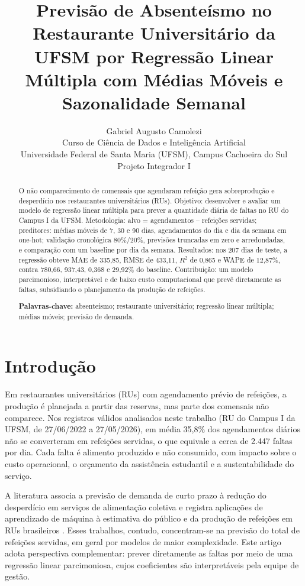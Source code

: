 \documentclass[11pt]{article}
\title{\large Previsão de Absenteísmo no
Restaurante Universitário da UFSM
por Regressão Linear Múltipla
com Médias Móveis e Sazonalidade Semanal}
\author{Gabriel Augusto Camolezi\\
\small Curso de Ciência de Dados e Inteligência Artificial\\
\small Universidade Federal de Santa Maria (UFSM), Campus Cachoeira do Sul\\
\small Projeto Integrador I}
\date{}
\begin{document}
\maketitle

\begin{abstract}
O não comparecimento de comensais que agendaram refeição gera sobreprodução e desperdício nos restaurantes universitários (RUs). Objetivo: desenvolver e avaliar um modelo de regressão linear múltipla para prever a quantidade diária de faltas no RU do Campus I da UFSM. Metodologia: alvo = agendamentos -- refeições servidas; preditores: médias móveis de 7, 30 e 90 dias, agendamentos do dia e dia da semana em one-hot; validação cronológica 80\%/20\%, previsões truncadas em zero e arredondadas, e comparação com um baseline por dia da semana. Resultados: nos 207 dias de teste, a regressão obteve MAE de 335,85, RMSE de 433,11, $R^2$ de 0,865 e WAPE de 12,87\%, contra 780,66, 937,43, 0,368 e 29,92\% do baseline. Contribuição: um modelo parcimonioso, interpretável e de baixo custo computacional que prevê diretamente as faltas, subsidiando o planejamento da produção de refeições.

\textbf{Palavras-chave:} absenteísmo; restaurante universitário; regressão linear múltipla; médias móveis; previsão de demanda.
\end{abstract}

\section{Introdução}

Em restaurantes universitários (RUs) com agendamento prévio de refeições, a produção é planejada a partir das reservas, mas parte dos comensais não comparece. Nos registros válidos analisados neste trabalho (RU do Campus I da UFSM, de 27/06/2022 a 27/05/2026), em média 35,8\% dos agendamentos diários não se converteram em refeições servidas, o que equivale a cerca de 2.447 faltas por dia. Cada falta é alimento produzido e não consumido, com impacto sobre o custo operacional, o orçamento da assistência estudantil e a sustentabilidade do serviço.

A literatura associa a previsão de demanda de curto prazo à redução do desperdício em serviços de alimentação coletiva \citep{rodrigues2024machine} e registra aplicações de aprendizado de máquina à estimativa do público e da produção de refeições em RUs brasileiros \citep{rocha2011utilizaccao,de2021metodo}. Esses trabalhos, contudo, concentram-se na previsão do total de refeições servidas, em geral por modelos de maior complexidade. Este artigo adota perspectiva complementar: prever diretamente as faltas por meio de uma regressão linear parcimoniosa, cujos coeficientes são interpretáveis pela equipe de gestão.
\end{document}

